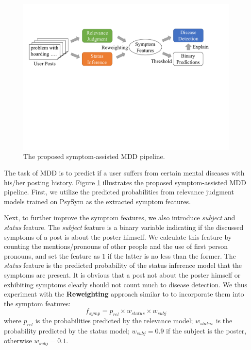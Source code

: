 \begin{figure}[h]
    \centering
    \includegraphics[width=1.0\columnwidth]{figures/mdd_pipeline.pdf}
    \caption{The proposed symptom-assisted MDD pipeline.}
    \label{fig:mdd_pipeline}
\end{figure}

The task of MDD is to predict if a user suffers from certain mental diseases with his/her posting history. Figure \ref{fig:mdd_pipeline} illustrates the proposed symptom-assisted MDD pipeline. First, we utilize the predicted probabilities from relevance judgment models trained on PsySym as the extracted symptom features. 

Next, to further improve the symptom features, we also introduce \textit{subject} and \textit{status} feature. The \textit{subject} feature is a binary variable indicating if the discussed symptoms of a post is about the poster himself. We calculate this feature by counting the mentions/pronouns of other people and the use of first person pronouns, and set the feature as 1 if the latter is no less than the former. The \textit{status} feature is the predicted probability of the status inference model that the symptoms are present. It is obvious that a post not about the poster himself or exhibiting symptoms clearly should not count much to disease detection. We thus experiment with the \textbf{Reweighting} approach similar to \citet{karmen2015screening} to incorporate them into the symptom features:
\begin{equation}
    f_{symp} = p_{rel} \times w_{status} \times w_{subj}
\end{equation}
where $p_{rel}$ is the probabilities predicted by the relevance model; $w_{status}$ is the probability predicted by the status model; $w_{subj} = 0.9$ if the subject is the poster, otherwise $w_{subj} = 0.1$.

